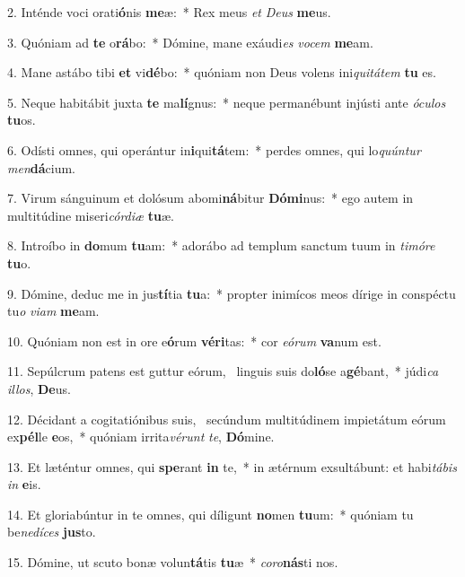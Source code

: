 2. Inténde voci orati\textbf{ó}nis \textbf{me}æ:~*  Rex meus \textit{et} \textit{De}\textit{us} \textbf{me}us.\

3. Quóniam ad \textbf{te} o\textbf{rá}bo:~*  Dómine, mane exáudi\textit{es} \textit{vo}\textit{cem} \textbf{me}am.\

4. Mane astábo tibi \textbf{et} vi\textbf{dé}bo:~*  quóniam non Deus volens ini\textit{qui}\textit{tá}\textit{tem} \textbf{tu} es.\

5. Neque habitábit juxta \textbf{te} ma\textbf{lí}gnus:~*  neque permanébunt injústi ante \textit{ó}\textit{cu}\textit{los} \textbf{tu}os.\

6. Odísti omnes, qui operántur in\textbf{i}qui\textbf{tá}tem:~*  perdes omnes, qui lo\textit{quún}\textit{tur} \textit{men}\textbf{dá}cium.\

7. Virum sánguinum et dolósum abomi\textbf{ná}bitur \textbf{Dó}\textbf{mi}nus:~*  ego autem in multitúdine miseri\textit{cór}\textit{di}\textit{æ} \textbf{tu}æ.\

8. Introíbo in \textbf{do}mum \textbf{tu}am:~*  adorábo ad templum sanctum tuum in \textit{ti}\textit{mó}\textit{re} \textbf{tu}o.\

9. Dómine, deduc me in jus\textbf{tí}tia \textbf{tu}a:~*  propter inimícos meos dírige in conspéctu tu\textit{o} \textit{vi}\textit{am} \textbf{me}am.\

10. Quóniam non est in ore e\textbf{ó}rum \textbf{vé}\textbf{ri}tas:~*  cor \textit{e}\textit{ó}\textit{rum} \textbf{va}num est.\

11. Sepúlcrum patens est guttur eórum, \dag\  linguis suis do\textbf{ló}se a\textbf{gé}bant,~*  júdi\textit{ca} \textit{il}\textit{los}, \textbf{De}us.\

12. Décidant a cogitatiónibus suis, \dag\  secúndum multitúdinem impietátum eórum ex\textbf{pél}le \textbf{e}os,~*  quóniam irrita\textit{vé}\textit{runt} \textit{te}, \textbf{Dó}mine.\

13. Et læténtur omnes, qui \textbf{spe}rant \textbf{in} te,~*  in ætérnum exsultábunt: et habi\textit{tá}\textit{bis} \textit{in} \textbf{e}is.\

14. Et gloriabúntur in te omnes, qui díligunt \textbf{no}men \textbf{tu}um:~*  quóniam tu be\textit{ne}\textit{dí}\textit{ces} \textbf{jus}to.\

15. Dómine, ut scuto bonæ volun\textbf{tá}tis \textbf{tu}æ~*  \textit{co}\textit{ro}\textbf{nás}ti nos.\


